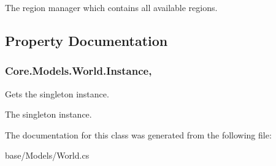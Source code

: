 The region manager which contains all available regions. 



\subsection{Property Documentation}
\hypertarget{classCore_1_1Models_1_1World_a1eb55db6738031929ddbca1b9aea971e}{}
\subsubsection[{Instance}]{ Core.\+Models.\+World.\+Instance\hspace{0.3cm}{\ttfamily [static]}, {\ttfamily [get]}}\label{classCore_1_1Models_1_1World_a1eb55db6738031929ddbca1b9aea971e}


Gets the singleton instance. 

The singleton instance.

The documentation for this class was generated from the following file\+:\begin{DoxyCompactItemize}
\item 
base/\+Models/World.\+cs\end{DoxyCompactItemize}
